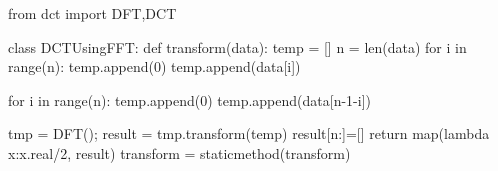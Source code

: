 \begin{python}
from dct import DFT,DCT

class DCTUsingFFT:
    def transform(data):
        temp = []
        n = len(data)
        for i in range(n):
            temp.append(0)
            temp.append(data[i])

        for i in range(n):
            temp.append(0)
            temp.append(data[n-1-i])

        tmp = DFT();
        result = tmp.transform(temp)
        result[n:]=[]
        return map(lambda x:x.real/2, result)
    transform = staticmethod(transform)
\end{python}

